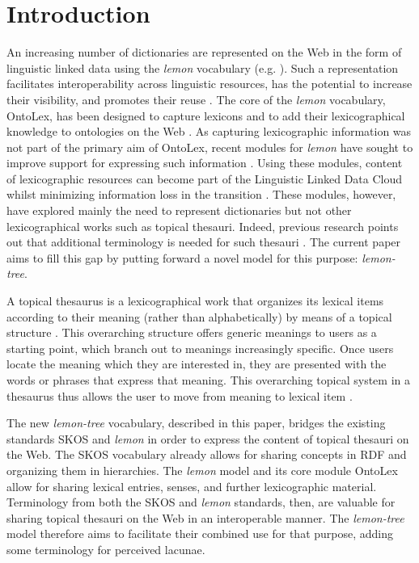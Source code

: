 
\section{Introduction}

An increasing number of dictionaries are represented on the Web in the form of linguistic linked data using the \emph{lemon} vocabulary (e.g. \cite{citeulike:14024090, DBLP:conf/esws/KhanDM16}). Such a representation facilitates interoperability across linguistic resources, has the potential to increase their visibility, and promotes their reuse \cite{declerck-2015, klimek2015enhancing}. The core of the \emph{lemon} vocabulary, OntoLex, has been designed to capture lexicons and to add their lexicographical knowledge to ontologies on the Web \cite{ref-LEMON}. As capturing lexicographic information was not part of the primary aim of OntoLex, recent modules for \emph{lemon} have sought to improve support for expressing such information \cite{DBLP:conf/esws/KhanDM16, citeulike:14396375}. Using these modules, content of lexicographic resources can become part of the Linguistic Linked Data Cloud whilst minimizing information loss in the transition \cite{citeulike:14396375}. These modules, however, have explored mainly the need to represent dictionaries but not other lexicographical works such as topical thesauri. Indeed, previous research points out that additional terminology is needed for such thesauri \cite{stolk-2017}. The current paper aims to fill this gap by putting forward a novel model for this purpose: \emph{lemon-tree}. 

A topical thesaurus is a lexicographical work that organizes its lexical items according to their meaning (rather than alphabetically) by means of a topical structure \cite{brown_thesauruses_2006, kay_diachronic_2016}.
This overarching structure offers generic meanings to users as a starting point, which branch out to meanings increasingly specific. Once users locate the meaning which they are interested in, they are presented with the words or phrases that express that meaning. This overarching topical system in a thesaurus thus allows the user to move from meaning to lexical item \cite{hullen_history_2004}.

The new \emph{lemon-tree} vocabulary, described in this paper, bridges the existing standards SKOS \cite{ref-SKOS} and \emph{lemon} in order to express the content of topical thesauri on the Web. The SKOS vocabulary already allows for sharing concepts in RDF and organizing them in hierarchies. The \emph{lemon} model and its core module OntoLex allow for sharing lexical entries, senses, and further lexicographic material. Terminology from both the SKOS and \emph{lemon} standards, then, are valuable for sharing topical thesauri on the Web in an interoperable manner. The \emph{lemon-tree} model therefore aims to facilitate their combined use for that purpose, adding some terminology for perceived lacunae.


